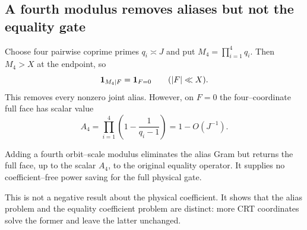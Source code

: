 \subsection{A fourth modulus removes aliases but not the equality gate}

Choose four pairwise coprime primes \(q_i\asymp J\) and put
\(M_4=\prod_{i=1}^4q_i\).  Then \(M_4>X\) at the endpoint, so
\begin{equation}
 \mathbf 1_{M_4\mid F}=\mathbf 1_{F=0}
 \qquad(|F|\ll X).
 \label{eq:tpc38-four-modulus-no-wrap}
\end{equation}
This removes every nonzero joint alias.  However, on \(F=0\) the
four--coordinate full face has scalar value
\begin{equation}
 A_4=\prod_{i=1}^4\left(1-\frac1{q_i-1}\right)
 =1-O(J^{-1}).
 \label{eq:tpc38-four-modulus-full-value}
\end{equation}

\begin{corollary}
\label{cor:tpc38-four-modulus-loopback}
Adding a fourth orbit--scale modulus eliminates the alias Gram but returns
the full face, up to the scalar \(A_4\), to the original equality operator.
It supplies no coefficient--free power saving for the full physical gate.
\end{corollary}

This is not a negative result about the physical coefficient.  It shows
that the alias problem and the equality coefficient problem are distinct:
more CRT coordinates solve the former and leave the latter unchanged.
